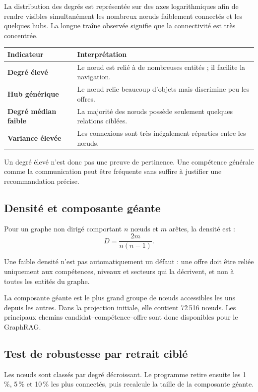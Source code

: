 \documentclass[12pt,a4paper]{article}
\begin{document}
La distribution des degrés est représentée sur des axes logarithmiques afin de rendre visibles
simultanément les nombreux nœuds faiblement connectés et les quelques hubs. La longue traîne
observée signifie que la connectivité est très concentrée.

\begin{tabularx}{\textwidth}{>{\bfseries}p{}X}
\toprule
Indicateur & Interprétation \\
\midrule
Degré élevé & Le nœud est relié à de nombreuses entités ; il facilite la navigation. \\
Hub générique & Le nœud relie beaucoup d'objets mais discrimine peu les offres. \\
Degré médian faible & La majorité des nœuds possède seulement quelques relations ciblées. \\
Variance élevée & Les connexions sont très inégalement réparties entre les nœuds. \\
\bottomrule
\end{tabularx}

Un degré élevé n'est donc pas une preuve de pertinence. Une compétence générale comme la
communication peut être fréquente sans suffire à justifier une recommandation précise.

\subsection{Densité et composante géante}

Pour un graphe non dirigé comportant $n$ nœuds et $m$ arêtes, la densité est :
\[
D=\frac{2m}{n(n-1)}.
\]

Une faible densité n'est pas automatiquement un défaut : une offre doit être reliée uniquement
aux compétences, niveaux et secteurs qui la décrivent, et non à toutes les entités du graphe.

La composante géante est le plus grand groupe de nœuds accessibles les uns depuis les autres.
Dans la projection initiale, elle contient 72\,516 nœuds. Les principaux chemins
candidat--compétence--offre sont donc disponibles pour le GraphRAG.

\subsection{Test de robustesse par retrait ciblé}

Les nœuds sont classés par degré décroissant. Le programme retire ensuite les 1\,\%, 5\,\% et
10\,\% les plus connectés, puis recalcule la taille de la composante géante.
\end{document}
